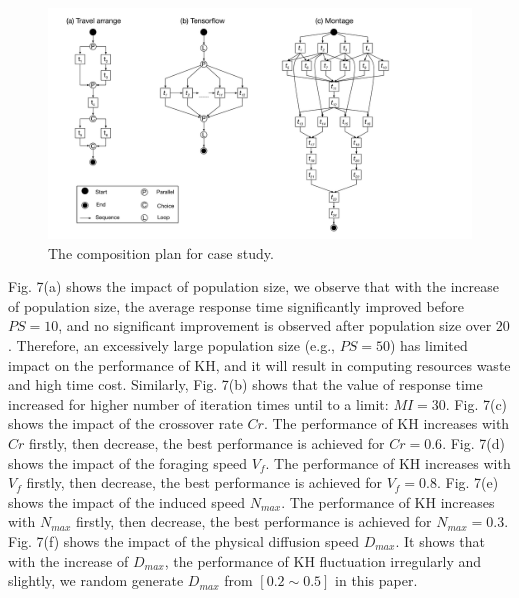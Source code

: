\documentclass[journal]{IEEEtran}
\begin{document}
\begin{figure}[!t]
\centering
\includegraphics[width=5in]{./img/DAG.pdf}
\caption{The composition plan for case study.}
\label{fig_DAG}
\end{figure}

Fig. 7(a) shows the impact of population size, we observe that with the increase of population size, the average response time significantly improved before $PS=10$, and no significant improvement is observed after population size over $20$. Therefore, an excessively large population size (e.g., $PS=50$) has limited impact on the performance of KH, and it will result in computing resources waste and high time cost.
Similarly, Fig. 7(b) shows that the value of response time increased for higher number of iteration times until to a limit: $MI = 30$. 
Fig. 7(c) shows the impact of the crossover rate $Cr$. The performance of KH increases with $Cr$ firstly, then decrease, the best performance is achieved for $Cr = 0.6$.
Fig. 7(d) shows the impact of the foraging speed $V_f$. The performance of KH increases with $V_f$ firstly, then decrease, the best performance is achieved for $V_f = 0.8$.
Fig. 7(e) shows the impact of the induced speed $N_{max}$. The performance of KH increases with $N_{max}$ firstly, then decrease, the best performance is achieved for $N_{max} = 0.3$.
Fig. 7(f) shows the impact of the physical diffusion speed $D_{max}$. It shows that with the increase of $D_{max}$, the performance of KH fluctuation irregularly and slightly, we random generate $D_{max}$ from $[0.2 \sim 0.5]$ in this paper.
\end{document}
